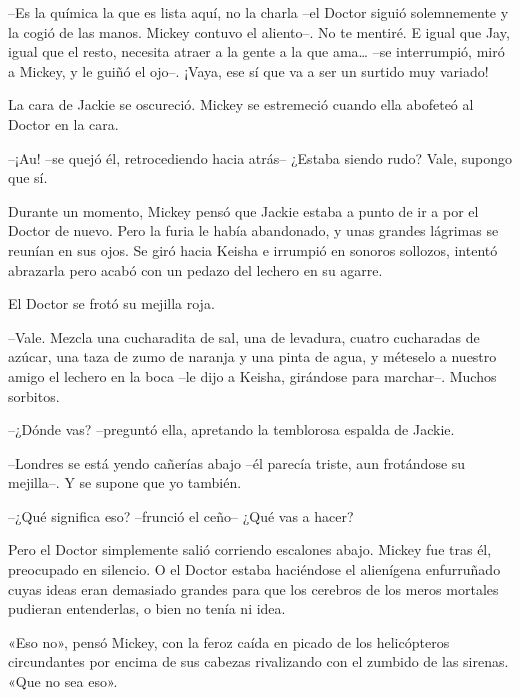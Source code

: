 {--Es la química la que es lista aquí, no la charla --el Doctor siguió
 solemnemente y la cogió de las manos. Mickey contuvo el aliento--. No te
 mentiré. E igual que Jay, igual que el resto, necesita atraer a la gente
 a la que ama\ldots{} --se interrumpió, miró a Mickey, y le guiñó el
ojo--. ¡Vaya, ese sí que va a ser un surtido muy variado!}

{La cara de Jackie se oscureció. Mickey se estremeció cuando ella
abofeteó al Doctor en la cara.}

{--¡Au! --se quejó él, retrocediendo hacia atrás-- ¿Estaba siendo rudo?
Vale, supongo que sí.}

{Durante un momento, Mickey pensó que Jackie estaba a punto de ir a por
 el Doctor de nuevo. Pero la furia le había abandonado, y unas grandes
 lágrimas se reunían en sus ojos. Se giró hacia Keisha e irrumpió en
 sonoros sollozos, intentó abrazarla pero acabó con un pedazo del lechero
en su agarre.}

{El Doctor se frotó su mejilla roja.}

{--Vale. Mezcla una cucharadita de sal, una de levadura, cuatro
 cucharadas de azúcar, una taza de zumo de naranja y una pinta de agua, y
 méteselo a nuestro amigo el lechero en la boca --le dijo a Keisha,
girándose para marchar--. Muchos sorbitos.}

{--¿Dónde vas? --preguntó ella, apretando la temblorosa espalda de
Jackie.}

{--Londres se está yendo cañerías abajo --él parecía triste, aun
frotándose su mejilla--. Y se supone que yo también.}

{--¿Qué significa eso? --frunció el ceño-- ¿Qué vas a hacer?}

{Pero el Doctor simplemente salió corriendo escalones abajo. Mickey fue
 tras él, preocupado en silencio. O el Doctor estaba haciéndose el
 alienígena enfurruñado cuyas ideas eran demasiado grandes para que los
 cerebros de los meros mortales pudieran entenderlas, o bien no tenía ni
idea.}

{«Eso no», pensó Mickey, con la feroz caída en picado de los
 helicópteros circundantes por encima de sus cabezas rivalizando con el
zumbido de las sirenas. «Que no sea eso».}
